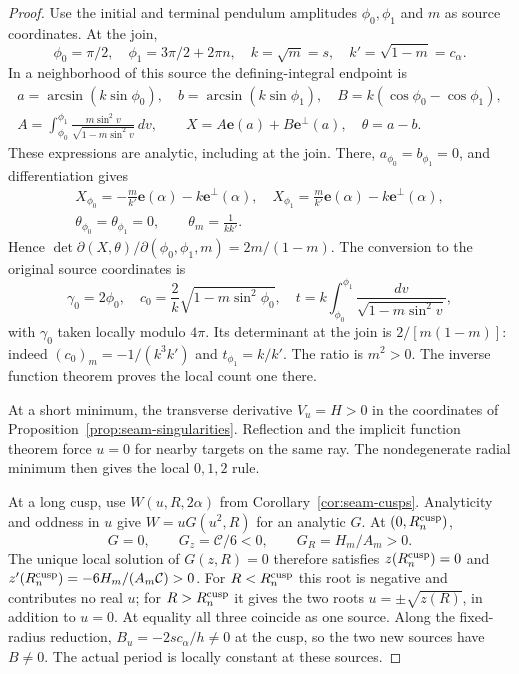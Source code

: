 \documentclass[11pt,a4paper]{article}
\theoremstyle{remark}\newtheorem{remark}[theorem]{Remark}
\newcommand{\ee}{\mathbf e}
\begin{document}
\begin{proof}
Use the initial and terminal pendulum amplitudes
$\phi_0,\phi_1$ and $m$ as source coordinates. At the join,
\[
 \phi_0=\pi/2,\quad \phi_1=3\pi/2+2\pi n,\quad
 k=\sqrt m=s,\quad k'=\sqrt{1-m}=c_\alpha.
\]
In a neighborhood of this source the defining-integral endpoint is
\[
 \begin{gathered}
 a=\arcsin(k\sin\phi_0),\quad b=\arcsin(k\sin\phi_1),
 \quad B=k(\cos\phi_0-\cos\phi_1),\\
 A=\int_{\phi_0}^{\phi_1}
       \frac{m\sin^2v}{\sqrt{1-m\sin^2v}}\,dv,
 \qquad X=A\ee(a)+B\ee^\perp(a),\quad\theta=a-b.
 \end{gathered}
\]
These expressions are analytic, including at the join. There,
$a_{\phi_0}=b_{\phi_1}=0$, and differentiation gives
\[
 \begin{gathered}
 X_{\phi_0}=-\frac m{k'}\ee(\alpha)-k\ee^\perp(\alpha),\quad
 X_{\phi_1}=\frac m{k'}\ee(\alpha)-k\ee^\perp(\alpha),\\
 \theta_{\phi_0}=\theta_{\phi_1}=0,\qquad \theta_m=\frac1{kk'}.
 \end{gathered}
\]
Hence $\det\partial(X,\theta)/\partial(\phi_0,\phi_1,m)=2m/(1-m)$.
The conversion to the original source coordinates is
\[
 \gamma_0=2\phi_0,\quad
 c_0=\frac2k\sqrt{1-m\sin^2\phi_0},\quad
 t=k\int_{\phi_0}^{\phi_1}\frac{dv}{\sqrt{1-m\sin^2v}},
\]
with $\gamma_0$ taken locally modulo $4\pi$. Its determinant at
the join is $2/[m(1-m)]$: indeed $(c_0)_m=-1/(k^3k')$
and $t_{\phi_1}=k/k'$. The ratio is $m^2>0$.
The inverse function theorem proves the local count one there.

At a short minimum, the transverse derivative $V_u=H>0$ in
the coordinates of Proposition~\ref{prop:seam-singularities}.
Reflection and the implicit function theorem force $u=0$ for
nearby targets on the same ray. The nondegenerate radial minimum
then gives the local $0,1,2$ rule.

At a long cusp, use $W(u,R,2\alpha)$ from
Corollary~\ref{cor:seam-cusps}. Analyticity and oddness in $u$
give $W=uG(u^2,R)$ for an analytic $G$. At $(0,R_n^{\rm cusp})$,
\[
 G=0,\qquad G_z=\mathcal C/6<0,\qquad
 G_R=H_m/A_m>0.
\]
The unique local solution of $G(z,R)=0$ therefore satisfies
$z(R_n^{\rm cusp})=0$ and $z'(R_n^{\rm cusp})=-6H_m/(A_m\mathcal C)>0$.
For $R<R_n^{\rm cusp}$ this root is negative and contributes no real $u$;
for $R>R_n^{\rm cusp}$ it gives the two roots $u=\pm\sqrt{z(R)}$,
in addition to $u=0$. At equality all three coincide as one source.
Along the fixed-radius reduction, $B_u=-2sc_\alpha/h\ne0$
at the cusp, so the two new sources have $B\ne0$.
The actual period is locally constant at these sources.
\end{proof}
\end{document}
